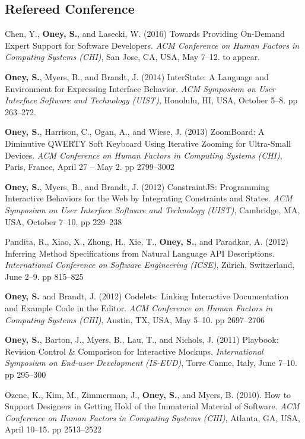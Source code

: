 \subsection{Refereed Conference}

 {
    Chen, Y., \textbf{Oney, S.}, and Lasecki, W. (2016) Towards Providing On-Demand Expert Support for Software Developers. \textit{ACM Conference on Human Factors in Computing Systems (CHI)}, San Jose, CA, USA, May 7--12.  to appear.
}

 {
    \textbf{Oney, S.}, Myers, B., and Brandt, J. (2014) InterState: A Language and Environment for Expressing Interface Behavior. \textit{ACM Symposium on User Interface Software and Technology (UIST)}, Honolulu, HI, USA, October 5--8.  pp 263--272.
}

 {
\textbf{Oney, S.}, Harrison, C., Ogan, A., and Wiese, J. (2013) ZoomBoard: A Diminutive QWERTY Soft Keyboard Using Iterative Zooming for Ultra-Small Devices. \textit{ACM Conference on Human Factors in Computing Systems (CHI)}, Paris, France, April 27 -- May 2. pp 2799--3002
}

 {
\textbf{Oney, S.}, Myers, B., and Brandt, J. (2012) ConstraintJS: Programming Interactive Behaviors for the Web by Integrating Constraints and States. \textit{ACM Symposium on User Interface Software and Technology (UIST)}, Cambridge, MA, USA, October 7--10. pp 229--238
}

 {
Pandita, R., Xiao, X., Zhong, H., Xie, T., \textbf{Oney, S.}, and Paradkar, A. (2012) Inferring Method Specifications from Natural Language API Descriptions. \textit{International Conference on Software Engineering (ICSE)}, Zürich, Switzerland, June 2--9. pp 815--825
}

 {
\textbf{Oney, S.} and Brandt, J. (2012) Codelets: Linking Interactive Documentation and Example Code in the Editor. \textit{ACM Conference on Human Factors in Computing Systems (CHI)}, Austin, TX, USA, May 5--10. pp 2697--2706
}

 {
\textbf{Oney, S.}, Barton, J., Myers, B., Lau, T., and Nichols, J. (2011) Playbook: Revision Control \& Comparison for Interactive Mockups. \textit{International Symposium on End-user Development (IS-EUD)}, Torre Canne, Italy, June 7--10. pp 295--300
}

 {
Ozenc, K., Kim, M., Zimmerman, J., \textbf{Oney, S.}, and Myers, B. (2010). How to Support Designers in Getting Hold of the Immaterial Material of Software. \textit{ACM Conference on Human Factors in Computing Systems (CHI)}, Atlanta, GA, USA, April 10--15. pp 2513--2522
}

